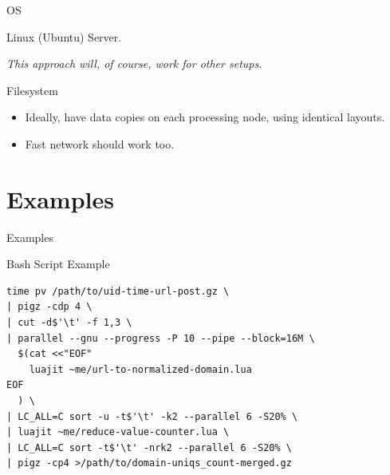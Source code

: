 \documentclass[handout]{beamer}
\begin{document}

\begin{frame}{OS}

\Large Linux (Ubuntu) Server.

\textit{This approach will, of course, work for other setups.}

\end{frame}


\begin{frame}{Filesystem}

\begin{itemize}
\item Ideally, have data copies on each processing node, using identical
      layouts.
\item Fast network should work too.
\end{itemize}

\end{frame}


\section{Examples}


\begin{frame}
\huge Examples
\end{frame}


\begin{frame}[fragile]{Bash Script Example}

\begin{verbatim}
time pv /path/to/uid-time-url-post.gz \
| pigz -cdp 4 \
| cut -d$'\t' -f 1,3 \
| parallel --gnu --progress -P 10 --pipe --block=16M \
  $(cat <<"EOF"
    luajit ~me/url-to-normalized-domain.lua
EOF
  ) \
| LC_ALL=C sort -u -t$'\t' -k2 --parallel 6 -S20% \
| luajit ~me/reduce-value-counter.lua \
| LC_ALL=C sort -t$'\t' -nrk2 --parallel 6 -S20% \
| pigz -cp4 >/path/to/domain-uniqs_count-merged.gz
\end{verbatim}

\end{frame}
\end{document}
